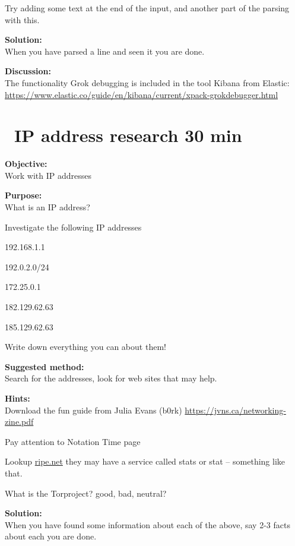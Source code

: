 \documentclass[a4paper,11pt,notitlepage]{report}
\begin{document}
Try adding some text at the end of the input, and another part of the parsing with this.

{\bf Solution:}\\
When you have parsed a line and seen it you are done.

{\bf Discussion:}\\
The functionality Grok debugging is included in the tool Kibana from Elastic:\\
\url{https://www.elastic.co/guide/en/kibana/current/xpack-grokdebugger.html}






\chapter{\faExclamationTriangle\ IP address research 30 min}
\label{ex:ip-address-research}

{\bf Objective:}\\
Work with IP addresses

{\bf Purpose:}\\
What is an IP address?

Investigate the following IP addresses
\begin{list2}
\item 192.168.1.1
\item 192.0.2.0/24
\item 172.25.0.1
\item 182.129.62.63
\item 185.129.62.63
\end{list2}

Write down everything you can about them!

{\bf Suggested method:}\\
Search for the addresses, look for web sites that may help.

{\bf Hints:}\\
Download the fun guide from Julia Evans (b0rk) \url{https://jvns.ca/networking-zine.pdf}

Pay attention to Notation Time page

Lookup \url{ripe.net} they may have a service called stats or stat -- something like that.

What is the Torproject? good, bad, neutral?

{\bf Solution:}\\
When you have found some information about each of the above, say 2-3 facts about each you are done.
\end{document}
